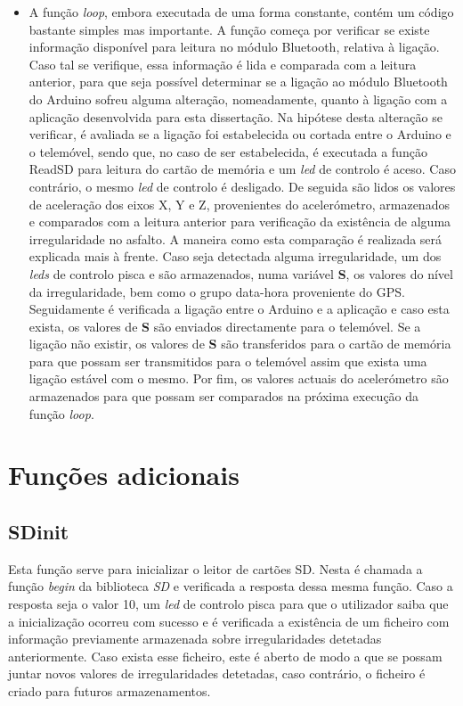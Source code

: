 \begin{itemize}
\item A função \emph{loop}, embora executada de uma forma constante, contém um código bastante simples mas importante.
A função começa por verificar se existe informação disponível para leitura no módulo Bluetooth, relativa à ligação.
Caso tal se verifique, essa informação é lida e comparada com a leitura anterior, para que seja possível determinar se a ligação ao módulo Bluetooth do Arduino sofreu alguma alteração, nomeadamente, quanto à ligação com a aplicação desenvolvida para esta dissertação.
Na hipótese desta alteração se verificar, é avaliada se a ligação foi estabelecida ou cortada entre o Arduino e o telemóvel, sendo que, no caso de ser estabelecida, é executada a função ReadSD para leitura do cartão de memória e um \emph{led} de controlo é aceso.
Caso contrário, o mesmo \emph{led} de controlo é desligado. 
De seguida são lidos os valores de aceleração dos eixos X, Y e Z, provenientes do acelerómetro, armazenados e comparados com a leitura anterior para verificação da existência de alguma irregularidade no asfalto.
A maneira como esta comparação é realizada será explicada mais à frente.
Caso seja detectada alguma irregularidade, um dos \emph{leds} de controlo pisca e são armazenados, numa variável \textbf{S}, os valores do nível da irregularidade, bem como o grupo data-hora proveniente do GPS.
Seguidamente é verificada a ligação entre o Arduino e a aplicação e caso esta exista, os valores de \textbf{S} são enviados directamente para o telemóvel.
Se a ligação não existir, os valores de \textbf{S} são transferidos para o cartão de memória para que possam ser transmitidos para o telemóvel assim que exista uma ligação estável com o mesmo.
Por fim, os valores actuais do acelerómetro são armazenados para que possam ser comparados na próxima execução da função \emph{loop}.
\end{itemize}

\section{Funções adicionais}
\label{sec:funcoes_adicionais}

\subsection{SD\textunderscore init}
\label{sub:sd_init}

Esta função serve para inicializar o leitor de cartões SD.
Nesta é chamada a função \emph{begin} da biblioteca \emph{SD} e verificada a resposta dessa mesma função.
Caso a resposta seja o valor 10, um \emph{led} de controlo pisca para que o utilizador saiba que a inicialização ocorreu com sucesso e é verificada a existência de um ficheiro com informação previamente armazenada sobre irregularidades detetadas anteriormente.
Caso exista esse ficheiro, este é aberto de modo a que se possam juntar novos valores de irregularidades detetadas, caso contrário, o ficheiro é criado para futuros armazenamentos.

